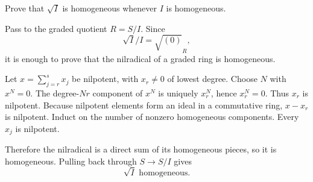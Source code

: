 \begin{problem}\label{prob:vi34-02}
Prove that \(\sqrt I\) is homogeneous whenever \(I\) is homogeneous.
\end{problem}

\ifdefined\FullProblemDossiers
\begin{solution}
Pass to the graded quotient \(R=S/I\). Since
\[
\sqrt I/I=\sqrt{(0)}_R,
\]
it is enough to prove that the nilradical of a graded ring is homogeneous.

Let \(x=\sum_{j=r}^s x_j\) be nilpotent, with \(x_r\neq0\) of lowest degree. Choose \(N\) with \(x^N=0\).
The degree-\(Nr\) component of \(x^N\) is uniquely \(x_r^N\), hence \(x_r^N=0\). Thus \(x_r\) is nilpotent.
Because nilpotent elements form an ideal in a commutative ring, \(x-x_r\) is nilpotent. Induct on the number of
nonzero homogeneous components. Every \(x_j\) is nilpotent.

Therefore the nilradical is a direct sum of its homogeneous pieces, so it is homogeneous. Pulling back through
\(S\to S/I\) gives
\[
\boxed{\sqrt I\text{ homogeneous}}.
\]
\end{solution}
\fi
